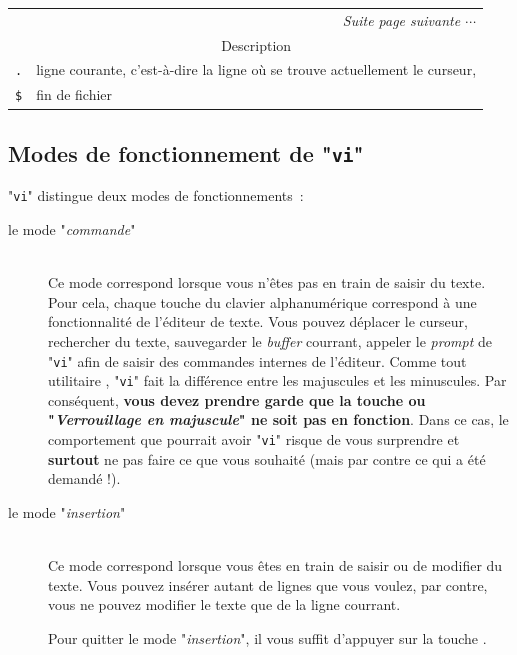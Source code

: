 \begin{longtable}{|l|p{10cm}|}
	\multicolumn{2}{r}{{\sl Suite page suivante $\cdots$}}	\\
\endfoot
\endlastfoot
	\hline
		\multicolumn{1}{|c|}{Marqueur}				&
		\multicolumn{1}{|c|}{Description}			\\
	\hline \hline
		{\tt .}		&	ligne courante, c'est-{\`a}-dire la ligne o{\`u} se trouve
						actuellement le curseur,	\\
	\hline
		\verb=$=	&	fin de fichier				\\
	\hline
\end{longtable}

\subsection{\label{ann-edt-vi-fcts}Modes de fonctionnement de "{\tt vi}"}

"{\tt vi}" distingue deux modes de fonctionnements~:
\begin{description}
	\item[{\rm le mode "{\sl commande}"}]\mbox{}\\
		Ce mode correspond lorsque vous n'{\^e}tes pas en train de saisir du texte.
		Pour cela, chaque touche du clavier alphanum{\'e}rique correspond {\`a} une
		fonctionnalit{\'e} de l'{\'e}diteur de texte. Vous pouvez d{\'e}placer le curseur,
		recher\-cher du texte, sauvegarder le {\sl buffer} courrant, appeler le
		{\sl prompt} de "{\tt vi}" afin de saisir des commandes
		internes de l'{\'e}diteur. Comme tout utilitaire {\Unix},
		"{\tt vi}" fait la diff{\'e}rence entre les majuscules et les minuscules.
		Par cons{\'e}quent, {\bf vous devez prendre garde que la touche 
		ou "{\sl Verrouillage en majuscule}" ne soit pas en fonction}. Dans
		ce cas, le comportement que pourrait avoir "{\tt vi}" risque de
		vous surprendre et {\bf surtout} ne pas faire ce que vous souhait{\'e} (mais
		par contre ce qui a {\'e}t{\'e} demand{\'e} !).\\[2ex]
	\item[{\rm le mode "{\sl insertion}"}]\mbox{}\\
		Ce mode correspond lorsque vous {\^e}tes en train de saisir ou de modifier
		du texte. Vous pouvez ins{\'e}rer autant de lignes que vous voulez, par contre,
		vous ne pouvez modifier le texte que de la ligne courrant.
		
		Pour quitter le mode "{\sl insertion}", il vous suffit d'appuyer
		sur la touche {\esckey}.
\end{description}

